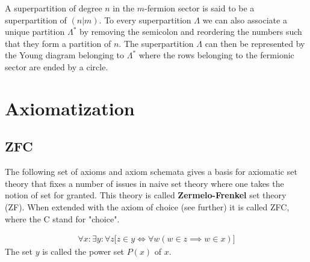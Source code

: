     \begin{notation}
        A superpartition of degree $n$ in the $m$-fermion sector is said to be a superpartition of $(n|m)$. To every superpartition $\Lambda$ we can also associate a unique partition $\Lambda^*$ by removing the semicolon and reordering the numbers such that they form a partition of $n$. The superpartition $\Lambda$ can then be represented by the Young diagram belonging to $\Lambda^*$ where the rows belonging to the fermionic sector are ended by a circle.
    \end{notation}

\section{Axiomatization}\label{set:section:axiomatization}
\subsection{ZFC}

    The following set of axioms and axiom schemata gives a basis for axiomatic set theory that fixes a number of issues in naive set theory where one takes the notion of set for granted. This theory is called \textbf{Zermelo-Frenkel} set theory (ZF). When extended with the axiom of choice (see further) it is called ZFC, where the C stand for "choice".

    \begin{axiom}\label{set:power_set_axiom}
        \begin{gather}
            \forall x:\exists y: \forall z\big[z\in y\iff \forall w(w\in z\implies w\in x)\big]
        \end{gather}
        The set $y$ is called the power set $P(x)$ of $x$.
    \end{axiom}

